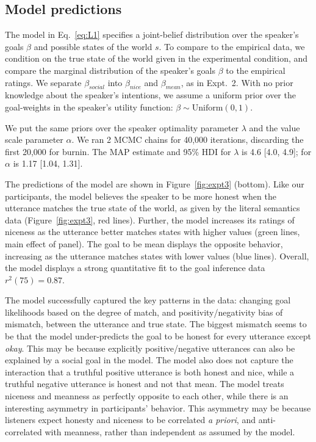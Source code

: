 \documentclass[10pt,letterpaper]{article}
\begin{document}
\subsection{Model predictions}

The model in Eq.~\ref{eq:L1} specifies a joint-belief distribution over the speaker's goals $\beta$ and possible states of the world $s$.
To compare to the empirical data, we condition on the true state of the world given in the experimental condition, and compare the marginal distribution of the speaker's goals $\beta$ to the empirical ratings.
We separate $\beta_{social}$ into  $\beta_{nice}$ and  $\beta_{mean}$, as in Expt.~2.
With no prior knowledge about the speaker's intentions, we assume a uniform prior over the goal-weights in the speaker's utility function: $\beta \sim \text{Uniform}(0,1)$.

We put the same priors over the speaker optimality parameter $\lambda$ and the value scale parameter $\alpha$.
We ran 2 MCMC chains for 40,000 iterations, discarding the first 20,000 for burnin.
The MAP estimate and 95\% HDI for $\lambda$ is 4.6 [4.0, 4.9]; for $\alpha$ is 1.17 [1.04, 1.31].%

The predictions of the model are shown in Figure~\ref{fig:expt3} (bottom).
Like our participants, the model believes the speaker to be more honest when the utterance matches the true state of the world, as given by the literal semantics data (Figure~\ref{fig:expt3}, red lines).
Further, the model increases its ratings of niceness as the utterance better matches states with higher values (green lines, main effect of panel).
The goal to be mean displays the opposite behavior, increasing as the utterance matches states with lower values (blue lines).
Overall, the model displays a strong quantitative fit to the goal inference data $r^2(75) = 0.87$.

The model successfully captured the key patterns in the data:
changing goal likelihoods based on the degree of match, and positivity/negativity bias of mismatch, between the utterance and true state.
The biggest mismatch seems to be that the model under-predicts the goal to be honest for every utterance except \emph{okay}.
This may be because explicitly positive/negative utterances can also be explained by a social goal in the model.
The model also does not capture the interaction that a truthful positive utterance is both honest and nice, while a truthful negative utterance is honest and not that mean.
 The model treats niceness and meanness as perfectly opposite to each other, while there is an interesting asymmetry in participants' behavior. 
This asymmetry may be because listeners expect honesty and niceness to be correlated \emph{a priori}, and anti-correlated with meanness, rather than independent as assumed by the model.
\end{document}

